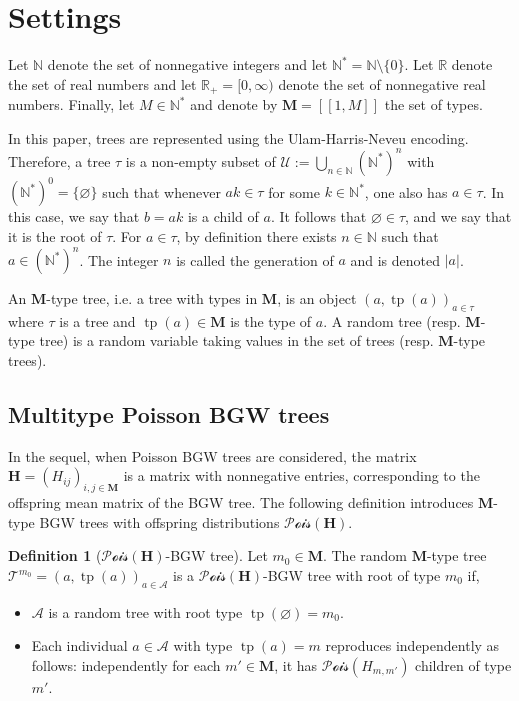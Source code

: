 \documentclass[reqno,final,11pt]{amsart}
\theoremstyle{plain}
\theoremstyle{definition}
\newtheorem{definition}[theorem]{Definition}
\theoremstyle{remark}
\newcommand{\R}{\mathds{R}}
\newcommand{\N}{\mathds{N}}
\newcommand{\M}{\bm{M}}
\newcommand{\T}{\mathcal{T}}
\newcommand{\A}{\mathcal{A}}
\renewcommand{\H}{\bm{H}}
\newcommand{\U}{\mathcal{U}}
\newcommand{\Pois}{\mathscr{P}\!\mathscr{o}\!\mathscr{i}\!\mathscr{s}}
\DeclareMathOperator{\tp}{tp}
\begin{document}
\section{Settings}\label{section2}

Let $\N$ denote the set of nonnegative integers and let $\N^*=\N\setminus\{0\}$. Let $\R$ denote the set of real numbers and let $\R_+=[0,\infty)$ denote the set of nonnegative real numbers. Finally, let $M\in\N^*$ and denote by $\M=[\![1,M]\!]$ the set of types.

In this paper, trees are represented using the Ulam-Harris-Neveu encoding. Therefore, a tree $\tau$ is a non-empty subset of $\U:= \bigcup_{n\in\N} (\N^*)^n$ with $(\N^*)^0 = \{ \varnothing \}$ such that whenever $ak\in\tau$ for some $k\in\N^*$, one also has $a\in\tau$. In this case, we say that $b=ak$ is a child of $a$. It follows that $\varnothing \in \tau$, and we say that it is the root of $\tau$. For $a\in\tau$, by definition there exists $n\in\N$ such that $a\in (\N^*)^n$. The integer $n$ is called the generation of $a$ and is denoted $\vert a \vert$.

An $\M$-type tree, i.e. a tree with types in $\M$, is an object $(a,\tp(a))_{a\in\tau}$ where $\tau$ is a tree and $\tp(a)\in\M$ is the type of $a$. A random tree (resp. $\M$-type tree) is a random variable taking values in the set of trees (resp. $\M$-type trees).

\subsection{Multitype Poisson BGW trees}

In the sequel, when Poisson BGW trees are considered, the matrix $\H = (H_{ij})_{i,j\in \M}$ is a matrix with nonnegative entries, corresponding to the offspring mean matrix of the BGW tree. The following definition introduces $\M$-type BGW trees with offspring distributions $\Pois(\H)$.

\begin{definition}[$\Pois(\H)$-BGW tree]
	Let $m_0\in\M$. The random $\M$-type tree $\T^{m_0} = (a,\tp(a))_{a\in\A}$ is a $\Pois(\H)$-BGW tree with root of type $m_0$ if,
	\begin{itemize}
    	\item $\A$ is a random tree with root type $\tp(\varnothing)=m_0$.
    	\item Each individual $a\in\A$ with type $\tp(a)=m$ reproduces independently as follows: independently for each $m'\in\M$, it has $\Pois(H_{m,m'})$ children of type $m'$.
	\end{itemize}
\end{definition}
\end{document}
